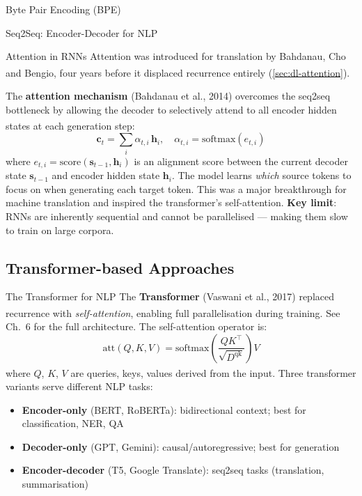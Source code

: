 \begin{v3topic}{Byte Pair Encoding (BPE)}
\begin{v3topic}{Seq2Seq: Encoder-Decoder for NLP}
\end{v3topic}
\begin{v3topic}{Attention in RNNs}
    Attention was introduced for translation by Bahdanau, Cho and
    Bengio\textsuperscript{\cite{bahdanauNeuralMachineTranslation2015}}, four
    years before it displaced recurrence entirely
    (\cref{sec:dl-attention}).

    The \textbf{attention mechanism} (Bahdanau et al., 2014) overcomes the seq2seq bottleneck by allowing the decoder to selectively attend to all encoder hidden states at each generation step\textsuperscript{\cite[][p.~8]{dhamaniIntroductionGenerativeAI2024}}:
    \begin{equation}
        \mathbf{c}_t = \sum_{i} \alpha_{t,i}\, \mathbf{h}_i, \quad \alpha_{t,i} = \mathrm{softmax}(e_{t,i})
    \end{equation}
    where $e_{t,i} = \mathrm{score}(\mathbf{s}_{t-1}, \mathbf{h}_i)$ is an alignment score between the current decoder state $\mathbf{s}_{t-1}$ and encoder hidden state $\mathbf{h}_i$.
    The model learns \emph{which} source tokens to focus on when generating each target token.
    This was a major breakthrough for machine translation and inspired the transformer's self-attention.
    \textbf{Key limit}: RNNs are inherently sequential and cannot be parallelised --- making them slow to train on large corpora.
\end{v3topic}

\subsection{Transformer-based Approaches}

\begin{v3topic}{The Transformer for NLP}
    The \textbf{Transformer} (Vaswani et al., 2017) replaced recurrence with \emph{self-attention}, enabling full parallelisation during training\textsuperscript{\cite[][]{vaswaniAttentionAllYou2023}}.
    See Ch.~6 for the full architecture. The self-attention operator is:
    \begin{equation}
        \mathrm{att}(Q, K, V) = \mathrm{softmax}\!\left(\frac{QK^\top}{\sqrt{D^{\mathrm{qk}}}}\right)\!V
    \end{equation}
    where $Q$, $K$, $V$ are queries, keys, values derived from the input\textsuperscript{\cite[][eq.~4.3]{fleuretLittleBookDeep}}.
    Three transformer variants serve different NLP tasks:
    \begin{itemize}
        \item \textbf{Encoder-only} (BERT, RoBERTa): bidirectional context; best for classification, NER, QA
        \item \textbf{Decoder-only} (GPT, Gemini): causal/autoregressive; best for generation
        \item \textbf{Encoder-decoder} (T5, Google Translate): seq2seq tasks (translation, summarisation)
    \end{itemize}


\end{v3topic}
\end{v3topic}
